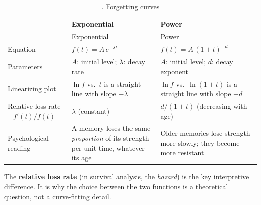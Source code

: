 \begin{longtable}[]{@{}
  >{\raggedright\arraybackslash}p{}
  >{\raggedright\arraybackslash}p{}
  >{\raggedright\arraybackslash}p{}@{}}
\caption{. Forgetting curves}\tabularnewline
\toprule\noalign{}
\begin{minipage}[b]{\linewidth}\raggedright
\end{minipage} & \begin{minipage}[b]{\linewidth}\raggedright
Exponential
\end{minipage} & \begin{minipage}[b]{\linewidth}\raggedright
Power
\end{minipage} \\
\midrule\noalign{}
\endfirsthead
\toprule\noalign{}
\begin{minipage}[b]{\linewidth}\raggedright
\end{minipage} & \begin{minipage}[b]{\linewidth}\raggedright
Exponential
\end{minipage} & \begin{minipage}[b]{\linewidth}\raggedright
Power
\end{minipage} \\
\midrule\noalign{}
\endhead
\bottomrule\noalign{}
\endlastfoot
Equation & \(f(t) = A\,e^{-\lambda t}\) & \(f(t) = A\,(1 + t)^{-d}\) \\
Parameters & \(A\): initial level; \(\lambda\): decay rate & \(A\):
initial level; \(d\): decay exponent \\
Linearizing plot & \(\ln f\) vs.~\(t\) is a straight line with slope
\(-\lambda\) & \(\ln f\) vs.~\(\ln(1+t)\) is a straight line with slope
\(-d\) \\
Relative loss rate \(-f'(t)/f(t)\) & \(\lambda\) (constant) &
\(d/(1+t)\) (decreasing with age) \\
Psychological reading & A memory loses the same \emph{proportion} of its
strength per unit time, whatever its age & Older memories lose strength
more slowly; they become more resistant \\
\end{longtable}

The \textbf{relative loss rate} (in survival analysis, the
\emph{hazard}) is the key interpretive difference. It is why the choice
between the two functions is a theoretical question, not a curve-fitting
detail.

